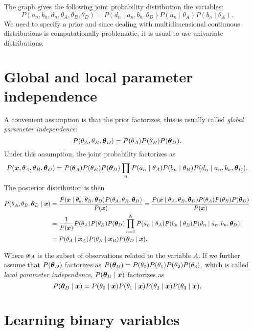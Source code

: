 The graph gives the following joint probability distribution the variables:
\[
P(a_{n},b_{n},d_{n}, \theta_A, \theta_B, \theta_D) = P(d_{n}\mid a_{n},b_{n},\theta_D)P(a_{n} \mid \theta_A)P(b_{n} \mid \theta_A).
\]
We need to specify a prior and since dealing with multidimensional continuous
distributions is computationally problematic, it is usual to use univariate
distributions.

\section{Global and local parameter independence}

A convenient assumption is that the prior factorizes, this is usually called
\emph{global parameter independence}:
\[
  P(\theta_{A}, \theta_{B}, \bm{\theta}_{D}) = P(\theta_{A})P(\theta_{B})P(\bm{\theta}_{D}).
\]
Under this assumption, the joint probability factorizes as
\[
  P(\bm{x}, \theta_{A}, \theta_{B}, \bm{\theta}_{D}) = P(\theta_{A})P(\theta_{B})P(\bm{\theta}_{D})\prod_{n}P(a_{n}\mid \theta_{A})P(b_{n} \mid \theta_{B})P(d_{n}\mid a_{n}, b_{n}, \bm{\theta}_{D}).
\]
The posterior distribution is then
\[
  \begin{aligned}
    P(\theta_{A}, \theta_{B}, \bm{\theta}_{D}\mid \bm{x})
    &= \frac{P(\bm{x} \mid \theta_{a}, \theta_{B}, \bm{\theta}_{D})P(\theta_{A}, \theta_{B}, \bm{\theta}_{D})}{P(\bm{x})} =\frac{P(\bm{x} \mid \theta_{A}, \theta_{B}, \bm{\theta}_{D})P(\theta_{A}) P(\theta_{B})P( \bm{\theta}_{D})}{P(\bm{x})}\\
    &= \frac{1}{P(\bm{x})}P(\theta_{A})P(\theta_{B})P(\bm{\theta}_{D})\prod_{n=1}^{N}P(a_{n}\mid \theta_{A})P(b_{n}\mid \theta_{B})P(d_{n}\mid a_{n}, b_{n},\bm{\theta}_{D})\\
    &= P(\theta_{A} \mid \bm{x}_{A} )P(\theta_{B}\mid \bm{x}_{B})P(\bm{\theta}_{D} \mid \bm{x}).
  \end{aligned}
\]

Where \(\bm{x}_{A}\) is the subset of observations related to the variable \(A\). If we further assume that \(P(\bm{\theta}_{D})\) factorizes as
\(P(\bm{\theta}_{D}) = P(\theta_{0})P(\theta_{1})P(\theta_{2})P(\theta_{3})\),
which is called \emph{local parameter independence}, \(P(\bm{\theta}_{D} \mid \bm{x})\) factorizes as
\[
  P(\bm{\theta}_{D}\mid \bm{x}) = P(\theta_{0} \mid \bm{x} )P(\theta_{1} \mid \bm{x} )P(\theta_{2} \mid \bm{x} )P(\theta_{3} \mid \bm{x} ).
\]

\section{Learning binary variables}


